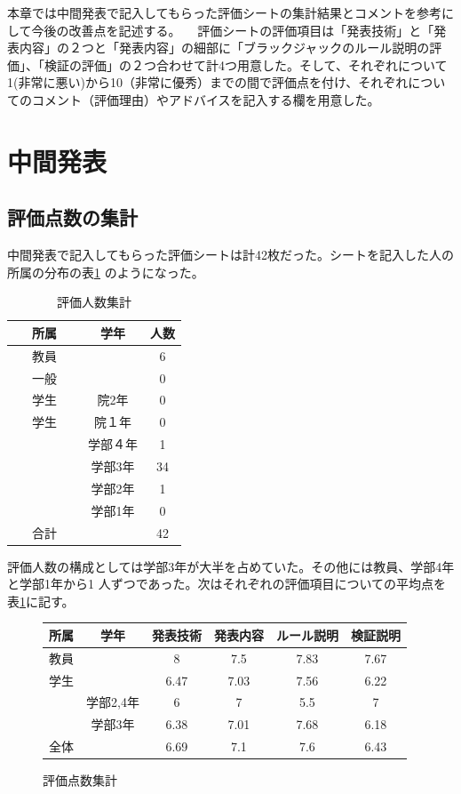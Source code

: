 本章では中間発表で記入してもらった評価シートの集計結果とコメントを参考にして今後の改善点を記述する。
　評価シートの評価項目は「発表技術」と「発表内容」の２つと「発表内容」の細部に「ブラックジャックのルール説明の評価」、「検証の評価」の２つ合わせて計4つ用意した。そして、それぞれについて1(非常に悪い)から10（非常に優秀）までの間で評価点を付け、それぞれについてのコメント（評価理由）やアドバイスを記入する欄を用意した。
\section{中間発表}
\subsection{評価点数の集計}
中間発表で記入してもらった評価シートは計42枚だった。シートを記入した人の所属の分布の表\ref{tab:dist} のようになった。

\begin{table}[htb]
  \begin{center}
    \caption{評価人数集計}
    \begin{tabular}{|c|c|c|} \hline 
      所属 & 学年 & 人数  \\ \hline \hline
      教員 &  & 6  \\
      一般 &  & 0 \\
      学生 & 院2年 & 0 \\
     学生 & 院１年 & 0 \\
             & 学部４年 & 1 \\
 　　　　　 & 学部3年 & 34 \\
             & 学部2年 & 1 \\
             & 学部1年 & 0 \\ \hline \hline
      合計 &  & 42 \\ \hline
    \end{tabular}
    \label{tab:dist}
  \end{center}
\end{table}

評価人数の構成としては学部3年が大半を占めていた。その他には教員、学部4年と学部1年から1
人ずつであった。次はそれぞれの評価項目についての平均点を表\ref{tab:point}に記す。

\begin{figure}
\begin{center}
\caption{評価点数集計}
\begin{tabular}{|c|c|c|c|c|c|} \hline
  所属 & 学年 & 発表技術 & 発表内容 & ルール説明 & 検証説明  \\ \hline \hline
  教員 &        & 8 & 7.5 & 7.83 & 7.67 \\
  学生 &        & 6.47 & 7.03 & 7.56 & 6.22 \\
         & 学部2,4年 & 6 & 7 & 5.5 & 7 \\
         & 学部3年 & 6.38 & 7.01 & 7.68 & 6.18 \\ \hline \hline
  全体 &        & 6.69 & 7.1 & 7.6 & 6.43 \\ \hline
\end{tabular}
\label{tab:point}
\end{center}
\end{figure}

